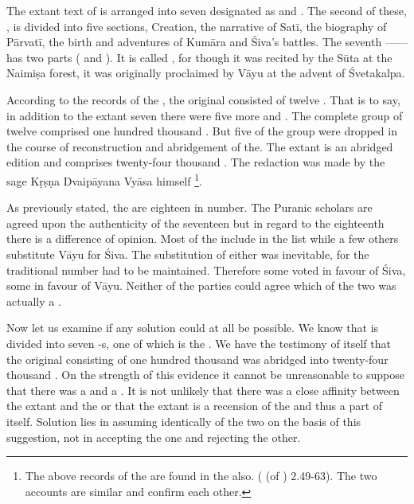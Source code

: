 The extant text of  is arranged into seven 
designated as  and
. The second of these, , is divided into five
sections, \viz Creation, the narrative of Satī, the biography of Pārvatī,
the birth and adventures of Kumāra and Śiva’s battles. The seventh
——has two parts ( and ).
It is called , for though it was recited by the Sūta at the Naimiṣa
forest, it was originally proclaimed by Vāyu at the advent of Śvetakalpa.

According to the records of the , the original 
consisted of twelve . That is to say, in addition to the extant
seven there were five more  \viz {} and . The complete group of twelve 
comprised one hundred thousand . But five of the group were dropped
in the course of reconstruction and abridgement of the. The extant
 is an abridged edition and comprises twenty-four thousand
. The redaction was made by the sage Kṛṣṇa Dvaipāyana Vyāsa himself
\footnote{The above records of the  are found in the
 also. ( (of )
2.49-63). The two accounts are similar and confirm each other.}.

As previously stated, the  are eighteen in number. The Puranic
scholars are agreed upon the authenticity of the seventeen  but
in regard to the eighteenth there is a difference of opinion. Most of the include
 in the list while a few others substitute Vāyu for Śiva.
The substitution of either was inevitable, for the traditional
number had to be maintained. Therefore some voted in favour of Śiva, some in
favour of Vāyu. Neither of the parties could agree which of the two was actually
a .

Now let us examine if any solution could at all be possible. We know that
 is divided into seven -s, one of which is the
. We have the testimony of  itself that the original
 consisting of one hundred thousand  was abridged
into twenty-four thousand . On the strength of this evidence it
cannot be unreasonable to suppose that there was a  and a
. It is not unlikely that there was a close affinity between
the extant  and the  or that the extant
 is a recension of the  and thus a part of
 itself. Solution lies in assuming identically of the two on
the basis of this suggestion, not in accepting the one and rejecting the other.

